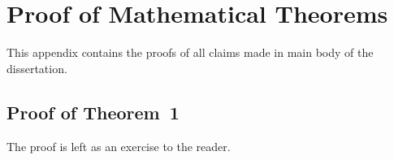\chapter{Proof of Mathematical Theorems}

This appendix contains the proofs of all claims made in main body of the dissertation.

\section{Proof of Theorem~1}

The proof is left as an exercise to the reader.